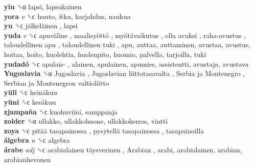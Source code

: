 \textbf{yiu} ␝α  lapsi, lapsukainen  \\
\textbf{yora} \emph{v}  ␝ϲ  huuto, itku, karjahdus, naukua  \\
\textbf{yu} ␝ϲ   jälkeläinen , lapsi  \\
\textbf{yuda} \emph{v}  ␝ϲ   apuväline ,  maalisyöttö ,  myötävaikutus ,  olla avuksi ,  raha-avustus ,  taloudellinen apu ,  taloudellinen tuki , apu, auttaa, auttaminen, avustaa, avustus, hoitaa, hoito, huolehtia, huolenpito, huomio, palvella, tarjoilla, tuki  \\
\textbf{yudadó} ␝ϲ   apulais- , alainen, apulainen, apumies, assistentti, avustaja, avustava  \\
\textbf{Yugoslavia} ␝α   Jugoslavia ,  Jugoslavian liittotasavalta ,  Serbia ja Montenegro ,  Serbian ja Montenegron valtioliitto   \\
\textbf{yüli} ␝ϲ   heinäkuu   \\
\textbf{yüni} ␝ϲ   kesäkuu   \\
\textbf{zjampaña} ␝ϲ  kuohuviini, samppanja  \\
\textbf{zolder} ␝α  ullakko, ullakkohuone, ullakkokerros, vintti  \\
\textbf{zoya} ␝ϲ   pitää tasapainossa ,  pysytellä tasapainossa , tasapainoilla  \\
\textbf{álgebra} \emph{n}  ␝ϲ  algebra  \\
\textbf{árabe} \emph{adj}  ␝ϲ   arabialainen täysverinen ,  Arabian , arabi, arabialainen, arabian, arabianhevonen  \\
